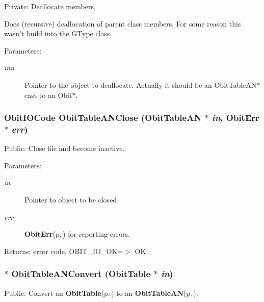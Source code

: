 Private: Deallocate members. 

Does (recursive) deallocation of parent class members. For some reason this wasn't build into the GType class. \begin{Desc}
\item[Parameters:]
\begin{description}
\item[{\em inn}]Pointer to the object to deallocate. Actually it should be an Obit\-Table\-AN$\ast$ cast to an Obit$\ast$. \end{description}
\end{Desc}
\subsubsection{\setlength{\rightskip}{0pt plus 5cm}Obit\-IOCode Obit\-Table\-ANClose ({\bf Obit\-Table\-AN} $\ast$ {\em in}, {\bf Obit\-Err} $\ast$ {\em err})}\label{ObitTableAN_8c_a25}


Public: Close file and become inactive. 

\begin{Desc}
\item[Parameters:]
\begin{description}
\item[{\em in}]Pointer to object to be closed. \item[{\em err}]{\bf Obit\-Err}{\rm (p.\,\pageref{structObitErr})} for reporting errors. \end{description}
\end{Desc}
\begin{Desc}
\item[Returns:]error code, OBIT\_\-IO\_\-OK=$>$ OK \end{Desc}
\subsubsection{$\ast$ Obit\-Table\-ANConvert ({\bf Obit\-Table} $\ast$ {\em in})}\label{ObitTableAN_8c_a19}


Public: Convert an {\bf Obit\-Table}{\rm (p.\,\pageref{structObitTable})} to an {\bf Obit\-Table\-AN}{\rm (p.\,\pageref{structObitTableAN})}. 

